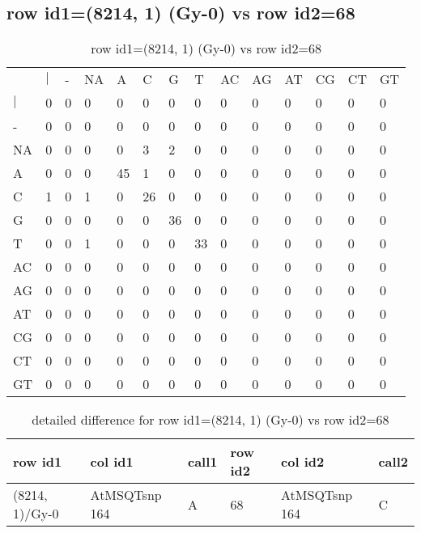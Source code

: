 \subsection{row id1=(8214, 1) (Gy-0) vs row id2=68}
\begin{center}
\begin{longtable}{|l|l|l|l|l|l|l|l|l|l|l|l|l|l|}
\caption{row id1=(8214, 1) (Gy-0) vs row id2=68} \label{table_dm344}\\
\hline
\\
\hline
&$|$&-&NA&A&C&G&T&AC&AG&AT&CG&CT&GT\\
$|$&0&0&0&0&0&0&0&0&0&0&0&0&0\\
-&0&0&0&0&0&0&0&0&0&0&0&0&0\\
NA&0&0&0&0&3&2&0&0&0&0&0&0&0\\
A&0&0&0&45&1&0&0&0&0&0&0&0&0\\
C&1&0&1&0&26&0&0&0&0&0&0&0&0\\
G&0&0&0&0&0&36&0&0&0&0&0&0&0\\
T&0&0&1&0&0&0&33&0&0&0&0&0&0\\
AC&0&0&0&0&0&0&0&0&0&0&0&0&0\\
AG&0&0&0&0&0&0&0&0&0&0&0&0&0\\
AT&0&0&0&0&0&0&0&0&0&0&0&0&0\\
CG&0&0&0&0&0&0&0&0&0&0&0&0&0\\
CT&0&0&0&0&0&0&0&0&0&0&0&0&0\\
GT&0&0&0&0&0&0&0&0&0&0&0&0&0\\
\hline
\end{longtable}
\end{center}

\begin{center}
\begin{longtable}{|l|l|l|l|l|l|}
\caption{detailed difference for row id1=(8214, 1) (Gy-0) vs row id2=68} \label{table_dm345}\\
\hline
row id1&col id1&call1&row id2&col id2&call2\\
\hline
(8214, 1)/Gy-0&AtMSQTsnp 164&A&68&AtMSQTsnp 164&C\\
\hline
\end{longtable}
\end{center}

